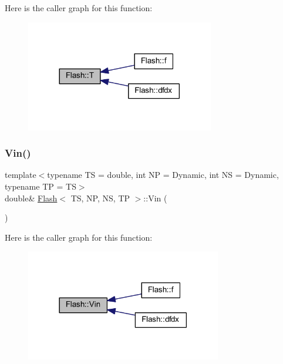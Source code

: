Here is the caller graph for this function\+:
\nopagebreak
\begin{figure}[H]
\begin{center}
\leavevmode
\includegraphics[width=233pt]{class_flash_af0f7e7c438368d98a6ea330d40b39cd3_icgraph}
\end{center}
\end{figure}
\mbox{\label{class_flash_aa4358ff3c66c1c461a2dba41436b95fe}} 
\subsubsection{\texorpdfstring{Vin()}{Vin()}}
{\footnotesize\ttfamily template$<$typename TS = double, int NP = Dynamic, int NS = Dynamic, typename TP = TS$>$ \\
double\& \mbox{\hyperlink{class_flash}{Flash}}$<$ TS, NP, NS, TP $>$\+::Vin (\begin{DoxyParamCaption}{ }\end{DoxyParamCaption})\hspace{0.3cm}{\ttfamily [inline]}}

Here is the caller graph for this function\+:
\nopagebreak
\begin{figure}[H]
\begin{center}
\leavevmode
\includegraphics[width=242pt]{class_flash_aa4358ff3c66c1c461a2dba41436b95fe_icgraph}
\end{center}
\end{figure}
\mbox{\label{class_flash_a14aa681b115b9ca955ab775ff5e674e0}} 
